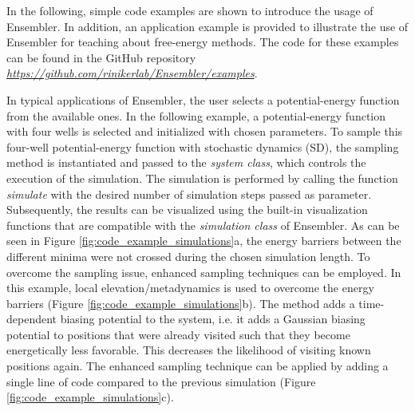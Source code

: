 In the following, simple code examples are shown to introduce the usage of Ensembler. In addition, an application example is provided to illustrate the use of Ensembler for teaching about free-energy methods. 
The code for these examples can be found in the GitHub repository \textit{\hyperlink{https://github.com/rinikerlab/Ensembler}{https://github.com/rinikerlab/Ensembler/examples}}.


In typical applications of Ensembler, the user selects a potential-energy function from the available ones. In the following example, a potential-energy function with four wells is selected and initialized with chosen parameters. 
To sample this four-well potential-energy function with stochastic dynamics (SD),\cite{Brunger1984} the sampling method is instantiated and passed to the \textit{system class}, which controls the execution of the simulation. 
The simulation is performed by calling the function \textit{simulate} with the desired number of simulation steps passed as parameter. 
Subsequently, the results can be visualized using the built-in visualization functions that are compatible with the \textit{simulation class} of Ensembler.  
As can be seen in Figure \ref{fig:code_example_simulations}a, the energy barriers between the different minima were not crossed during the chosen simulation length. 
To overcome the sampling issue, enhanced sampling techniques can be employed.\cite{Pohorille2010} 
In this example, local elevation\cite{Huber1994}/metadynamics\cite{Laio2002} is used to overcome the energy barriers (Figure \ref{fig:code_example_simulations}b).
The method adds a time-dependent biasing potential to the system, i.e. it adds a Gaussian biasing potential to positions that were already visited such that they become energetically less favorable. This decreases the likelihood of visiting known positions again. 
The enhanced sampling technique can be applied by adding a single line of code compared to the previous simulation (Figure \ref{fig:code_example_simulations}c).

